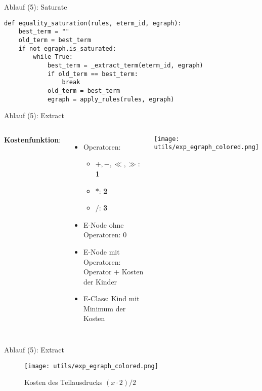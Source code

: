 \begin{frame}[fragile]{Ablauf (5): Saturate}
\begin{verbatim}    
def equality_saturation(rules, eterm_id, egraph):
    best_term = ""
    old_term = best_term
    if not egraph.is_saturated:
        while True:
            best_term = _extract_term(eterm_id, egraph)
            if old_term == best_term:
                break
            old_term = best_term
            egraph = apply_rules(rules, egraph)     
\end{verbatim}
\end{frame}

\begin{frame}{Ablauf (5): Extract}
    \begin{columns}[c]
            \textbf{Kostenfunktion}:
            \begin{itemize}
                \item Operatoren: \begin{itemize}
                    \item $+, -, \ll, \gg$: \textbf{1}
                    \item $*$: \textbf{2}
                    \item $/$: \textbf{3}
                \end{itemize}
                \item E-Node ohne Operatoren: \colorbox{green-400}{0}
                \item E-Node mit Operatoren: \colorbox{orange-400}{Operator + Kosten der Kinder}
                \item E-Class: \colorbox{blue-300}{Kind mit Minimum der Kosten}
            \end{itemize}
            
            \texttt{[image: utils/exp\_egraph\_colored.png]}
    \end{columns}
\end{frame}

\begin{frame}{Ablauf (5): Extract}
    \begin{figure}[H]
        \centering
        \texttt{[image: utils/exp\_egraph\_colored.png]}
        \caption{Kosten des Teilausdrucks $(x \cdot 2) / 2$}
        \label{fig:exp_egraph_costs}
    \end{figure}
\end{frame}